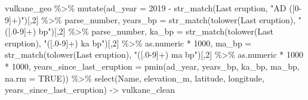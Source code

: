 \documentclass[
  ngerman,
]{article}
\newenvironment{Shaded}{\begin{snugshade}}{\end{snugshade}}
\newcommand{\AttributeTok}[1]{\textcolor[rgb]{0.77,0.63,0.00}{#1}}
\newcommand{\ConstantTok}[1]{\textcolor[rgb]{0.00,0.00,0.00}{#1}}
\newcommand{\DecValTok}[1]{\textcolor[rgb]{0.00,0.00,0.81}{#1}}
\newcommand{\FunctionTok}[1]{\textcolor[rgb]{0.00,0.00,0.00}{#1}}
\newcommand{\NormalTok}[1]{#1}
\newcommand{\OtherTok}[1]{\textcolor[rgb]{0.56,0.35,0.01}{#1}}
\newcommand{\SpecialCharTok}[1]{\textcolor[rgb]{0.00,0.00,0.00}{#1}}
\newcommand{\StringTok}[1]{\textcolor[rgb]{0.31,0.60,0.02}{#1}}
\begin{document}
\begin{Shaded}
\begin{Highlighting}[]
\NormalTok{vulkane\_geo }\SpecialCharTok{\%\textgreater{}\%}
  \FunctionTok{mutate}\NormalTok{(}\AttributeTok{ad\_year =} \DecValTok{2019} \SpecialCharTok{{-}} \FunctionTok{str\_match}\NormalTok{(}\StringTok{\textasciigrave{}}\AttributeTok{Last eruption}\StringTok{\textasciigrave{}}\NormalTok{,}
                                    \StringTok{"AD ([0{-}9]+)"}\NormalTok{)[,}\DecValTok{2}\NormalTok{] }\SpecialCharTok{\%\textgreater{}\%}
\NormalTok{                     parse\_number,}
         \AttributeTok{years\_bp =} \FunctionTok{str\_match}\NormalTok{(}\FunctionTok{tolower}\NormalTok{(}\StringTok{\textasciigrave{}}\AttributeTok{Last eruption}\StringTok{\textasciigrave{}}\NormalTok{),}
                              \StringTok{"([.0{-}9]+) bp"}\NormalTok{)[,}\DecValTok{2}\NormalTok{] }\SpecialCharTok{\%\textgreater{}\%}
\NormalTok{                      parse\_number,}
         \AttributeTok{ka\_bp =} \FunctionTok{str\_match}\NormalTok{(}\FunctionTok{tolower}\NormalTok{(}\StringTok{\textasciigrave{}}\AttributeTok{Last eruption}\StringTok{\textasciigrave{}}\NormalTok{),}
                           \StringTok{"([.0{-}9]+) ka bp"}\NormalTok{)[,}\DecValTok{2}\NormalTok{] }\SpecialCharTok{\%\textgreater{}\%} 
\NormalTok{                   as.numeric }\SpecialCharTok{*} \DecValTok{1000}\NormalTok{,}
         \AttributeTok{ma\_bp =} \FunctionTok{str\_match}\NormalTok{(}\FunctionTok{tolower}\NormalTok{(}\StringTok{\textasciigrave{}}\AttributeTok{Last eruption}\StringTok{\textasciigrave{}}\NormalTok{),}
                           \StringTok{"([.0{-}9]+) ma bp"}\NormalTok{)[,}\DecValTok{2}\NormalTok{] }\SpecialCharTok{\%\textgreater{}\%}
\NormalTok{                   as.numeric }\SpecialCharTok{*} \DecValTok{1000} \SpecialCharTok{*} \DecValTok{1000}\NormalTok{,}
         \AttributeTok{years\_since\_last\_eruption =} \FunctionTok{pmin}\NormalTok{(ad\_year,}
\NormalTok{                                          years\_bp,}
\NormalTok{                                          ka\_bp,}
\NormalTok{                                          ma\_bp,}
                                          \AttributeTok{na.rm =} \ConstantTok{TRUE}\NormalTok{)) }\SpecialCharTok{\%\textgreater{}\%}
  \FunctionTok{select}\NormalTok{(Name,}
\NormalTok{         elevation\_m,}
\NormalTok{         latitude,}
\NormalTok{         longitude,}
\NormalTok{         years\_since\_last\_eruption) }\OtherTok{{-}\textgreater{}}\NormalTok{ vulkane\_clean}
\end{Highlighting}
\end{Shaded}
\end{document}
